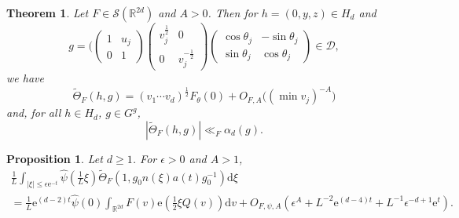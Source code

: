 \documentclass[10pt,a4paper]{amsart}
\newtheorem{prop}{Proposition}
\newtheorem{thm}{Theorem}
\newcommand{\R}{\mathbb{R}}
\newcommand{\cD}{\mathcal{D}}
\newcommand{\cS}{\mathcal{S}}
\newcommand{\dd}{\mathrm{d}}
\newcommand{\e}{\mathrm{e}}
\begin{document}
\begin{thm}
  \label{thm:thetaasymptotic}
  Let $F\in\cS(\R^{2d})$ and $A > 0$. Then for $h=(0,y,z)\in H_d$ and
  $$g
  = (
  \begin{pmatrix}
    1 & u_j \\
    0 & 1
  \end{pmatrix}
  \begin{pmatrix}
    v_j^{\frac{1}{2}} & 0 \\
    0 & v_j^{-\frac{1}{2}}
  \end{pmatrix}
  \begin{pmatrix}
    \cos \theta_j & -\sin \theta_j \\
    \sin \theta_j & \cos \theta_j
  \end{pmatrix}
  \in\cD,$$ we have
  \begin{equation}
    \label{eq:thetaasymp}
    \widetilde\Theta_F(h, g) = (v_1 \cdots v_d)^{\frac{1}{2}} F_\theta(0) + O_{F,A}\big((\min v_j)^{-A}\big) 
  \end{equation}
  and, for all $h\in H_d$, $g\in G^g$,
 \begin{equation}
    \label{eq:thetaasymp123}
    |\widetilde\Theta_F(h, g)|  \ll_F \alpha_d(g).
  \end{equation}
\end{thm}

\begin{prop}
Let $d\geq 1$. For $\epsilon>0$ and $A > 1$,
\begin{multline}\label{lemX1}
 \tfrac{1}{L} \int_{|\xi|\leq \epsilon \e^{-t}} \hat{\psi} ( \tfrac{1}{L}\xi ) \widetilde\Theta_F(1, g_0 n(\xi) a(t) g_0^{-1}) \dd \xi \\
= \tfrac{1}{L} \e^{(d-2)t} \hat \psi(0) \int_{\mathbb{R}^{2d}} F(v) \e( \tfrac{1}{2} \xi Q(v) ) \dd v
+ O_{F,\psi, A}(\epsilon^{A} + L^{-2} \e^{(d-4)t} + L^{-1} \epsilon^{-d + 1} \e^t) .
\end{multline}
\end{prop}
\end{document}
